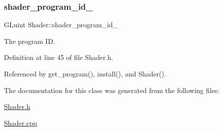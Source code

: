\subsubsection{\texorpdfstring{shader\+\_\+program\+\_\+id\+\_\+}{shader\_program\_id\_}}
{\footnotesize\ttfamily G\+Luint Shader\+::shader\+\_\+program\+\_\+id\+\_\+\hspace{0.3cm}{\ttfamily [private]}}



The program ID. 



Definition at line 45 of file Shader.\+h.



Referenced by get\+\_\+program(), install(), and Shader().



The documentation for this class was generated from the following files\+:\begin{DoxyCompactItemize}
\item 
\mbox{\hyperlink{Shader_8h}{Shader.\+h}}\item 
\mbox{\hyperlink{Shader_8cpp}{Shader.\+cpp}}\end{DoxyCompactItemize}
